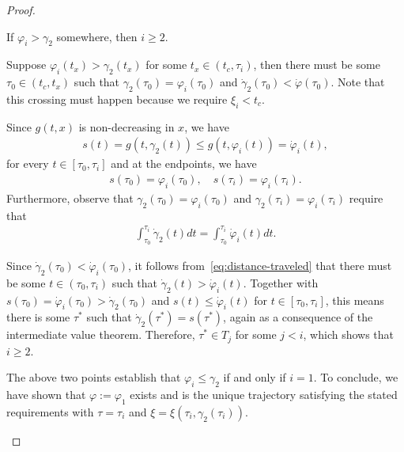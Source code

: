 \documentclass[a4paper]{article}
\theoremstyle{definition}
\theoremstyle{plain}
\begin{document}
\begin{proof}
\begin{outline}
  \1 If $\varphi_{i} > \gamma_{2}$ somewhere, then $i \geq 2$.

  \2 Suppose $\varphi_{i}(t_{x}) > \gamma_{2}(t_{x})$ for some
  $t_{x} \in (t_{c}, \tau_{i})$, then there must be some
  $\tau_{0} \in (t_{c}, t_{x})$ such that
  $\gamma_{2}(\tau_{0}) = \varphi_{i}(\tau_{0})$ and
  $\dot{\gamma}_{2}(\tau_{0}) < \dot{\varphi}(\tau_{0})$. Note that this
  crossing must happen because we require $\xi_{i} < t_{c}$.

  \2 Since $g(t, x)$ is non-decreasing in $x$, we have
  \begin{align}
    s(t) = g(t, \gamma_{2}(t)) \leq g(t, \varphi_{i}(t)) = \dot{\varphi}_{i}(t) ,
  \end{align}
  for every $t \in [\tau_{0}, \tau_{i}]$ and at the endpoints, we have
  \begin{align}
    s(\tau_{0}) = \varphi_{i}(\tau_{0}), \quad s(\tau_{i}) = \varphi_{i}(\tau_{i}) .
  \end{align}
  Furthermore, observe that $\gamma_{2}(\tau_{0}) = \varphi_{i}(\tau_{0})$ and
  $\gamma_{2}(\tau_{i}) = \varphi_{i}(\tau_{i})$ require that
  \begin{align}\label{eq:distance-traveled}
    \int_{\tau_{0}}^{\tau_{i}} \dot{\gamma}_{2}(t) dt  = \int_{\tau_{0}}^{\tau_{i}} \dot{\varphi}_{i}(t) dt .
  \end{align}

  \2 Since $\dot{\gamma}_{2}(\tau_{0}) < \dot{\varphi}_{i}(\tau_{0})$, it follows
  from~\eqref{eq:distance-traveled} that there must be some $t \in (\tau_{0}, \tau_{i})$
  such that $\dot{\gamma}_{2}(t) > \dot{\varphi}_{i}(t)$.
  Together with $s(\tau_{0}) = \dot{\varphi}_{i}(\tau_{0}) > \dot{\gamma}_{2}(\tau_{0})$
  and $s(t) \leq \dot{\varphi}_{i}(t)$ for $t \in [\tau_{0}, \tau_{i}]$, this means there is some $\tau^{*}$ such
  that $\dot{\gamma}_{2}(\tau^{*}) = s(\tau^{*})$, again as a consequence of the
  intermediate value theorem. Therefore, $\tau^{*} \in T_{j}$ for some $j < i$, which
  shows that $i \geq 2$.


  \1 The above two points establish that $\varphi_{i} \leq \gamma_{2}$ if and only if $i=1$.
  To conclude, we have shown that $\varphi := \varphi_{1}$ exists and is the unique
  trajectory satisfying the stated requirements with $\tau = \tau_{i}$ and
  $\xi = \xi(\tau_{i}, \gamma_{2}(\tau_{i}))$. \qedhere
\end{outline}
\end{proof}
\end{document}
